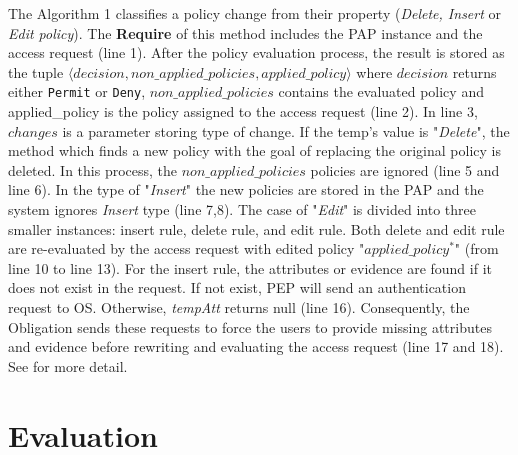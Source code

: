 The Algorithm 1 classifies a policy change from their property (\textit{Delete, Insert} or \textit{Edit policy}). 
The \textbf{Require} of this method includes the PAP instance and the access request (line 1).
After the policy evaluation process, the result is stored as the tuple $\langle decision, non\_applied\_policies, applied\_policy \rangle$ where $decision$ returns either \texttt{Permit} or \texttt{Deny}, $non\_applied\_policies$ contains the evaluated policy and applied\_policy is the policy assigned to the access request (line 2).
In line 3, $changes$ is a parameter storing type of change. 
If the temp's value is "\textit{Delete}", the method which finds a new policy with the goal of replacing the original policy is deleted.
In this process, the $non\_applied\_policies$ policies are ignored (line 5 and line 6). 
In the type of "\textit{Insert}" the new policies are stored in the PAP and the system ignores \textit{Insert} type (line 7,8).
The case of "\textit{Edit}" is divided into three smaller instances: insert rule, delete rule, and edit rule. 
Both delete and edit rule are re-evaluated by the access request with edited policy "$applied\_policy^*$" (from line 10 to line 13).
For the insert rule, the attributes or evidence are found if it does not exist in the request.
If not exist, PEP will send an authentication request to OS. Otherwise, \textit{tempAtt} returns null (line 16). 
Consequently, the Obligation sends these requests to force the users to provide missing attributes and evidence before rewriting and evaluating the access request (line 17 and 18). 
See \cite{son2017rew} for more detail.

\section{Evaluation}\label{sec:eva}


